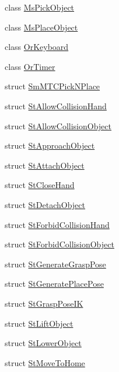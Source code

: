 \begin{DoxyCompactItemize}
\item 
class \hyperlink{classsm__mtc__picknplace_1_1MsPickObject}{Ms\+Pick\+Object}
\item 
class \hyperlink{classsm__mtc__picknplace_1_1MsPlaceObject}{Ms\+Place\+Object}
\item 
class \hyperlink{classsm__mtc__picknplace_1_1OrKeyboard}{Or\+Keyboard}
\item 
class \hyperlink{classsm__mtc__picknplace_1_1OrTimer}{Or\+Timer}
\item 
struct \hyperlink{structsm__mtc__picknplace_1_1SmMTCPickNPlace}{Sm\+M\+T\+C\+Pick\+N\+Place}
\item 
struct \hyperlink{structsm__mtc__picknplace_1_1StAllowCollisionHand}{St\+Allow\+Collision\+Hand}
\item 
struct \hyperlink{structsm__mtc__picknplace_1_1StAllowCollisionObject}{St\+Allow\+Collision\+Object}
\item 
struct \hyperlink{structsm__mtc__picknplace_1_1StApproachObject}{St\+Approach\+Object}
\item 
struct \hyperlink{structsm__mtc__picknplace_1_1StAttachObject}{St\+Attach\+Object}
\item 
struct \hyperlink{structsm__mtc__picknplace_1_1StCloseHand}{St\+Close\+Hand}
\item 
struct \hyperlink{structsm__mtc__picknplace_1_1StDetachObject}{St\+Detach\+Object}
\item 
struct \hyperlink{structsm__mtc__picknplace_1_1StForbidCollisionHand}{St\+Forbid\+Collision\+Hand}
\item 
struct \hyperlink{structsm__mtc__picknplace_1_1StForbidCollisionObject}{St\+Forbid\+Collision\+Object}
\item 
struct \hyperlink{structsm__mtc__picknplace_1_1StGenerateGraspPose}{St\+Generate\+Grasp\+Pose}
\item 
struct \hyperlink{structsm__mtc__picknplace_1_1StGeneratePlacePose}{St\+Generate\+Place\+Pose}
\item 
struct \hyperlink{structsm__mtc__picknplace_1_1StGraspPoseIK}{St\+Grasp\+Pose\+IK}
\item 
struct \hyperlink{structsm__mtc__picknplace_1_1StLiftObject}{St\+Lift\+Object}
\item 
struct \hyperlink{structsm__mtc__picknplace_1_1StLowerObject}{St\+Lower\+Object}
\item 
struct \hyperlink{structsm__mtc__picknplace_1_1StMoveToHome}{St\+Move\+To\+Home}
\item 

\end{DoxyCompactItemize}
